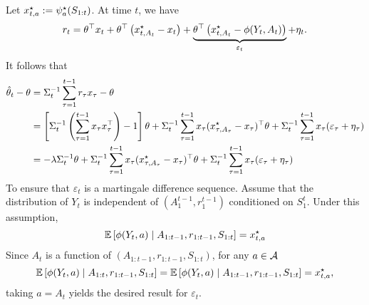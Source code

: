 \documentclass[letterpaper,11pt]{article}
\begin{document}
Let $x^\star_{t,a} := \psi^\star_a(S_{1:t})$.
At time $t$, we have  
$$
r_t = \theta^\top x_t + \theta^\top \left(x^\star_{t,A_t} - x_t\right) + \underbrace{\theta^\top \left(x^\star_{t,A_t} - \phi(Y_t, A_t)\right)}_{\varepsilon_t} + \eta_t.
$$
It follows that 
\begin{equation*}
\begin{aligned}
    \hat{\theta}_t - \theta &= \Sigma_t^{-1} \sum_{\tau=1}^{t-1} r_{\tau} x_{\tau} - \theta \\
    &= \left[\Sigma_t^{-1} \left(\sum_{\tau=1}^{t-1} x_{\tau} x_{\tau}^\top\right) - 1\right] \theta + \Sigma_t^{-1} \sum_{\tau=1}^{t-1} x_{\tau} (x^\star_{\tau,A_\tau} - x_\tau)^\top \theta + \Sigma_t^{-1} \sum_{\tau=1}^{t-1} x_{\tau} (\varepsilon_\tau + \eta_\tau)\\
    &= -\lambda \Sigma_t^{-1} \theta + \Sigma_t^{-1} \sum_{\tau=1}^{t-1} x_{\tau} (x^\star_{\tau,A_\tau} - x_\tau)^\top \theta + \Sigma_t^{-1} \sum_{\tau=1}^{t-1} x_{\tau} (\varepsilon_\tau + \eta_\tau)\\
\end{aligned}
\end{equation*}
To ensure that $\varepsilon_t$ is a martingale difference sequence. 
Assume that the distribution of $Y_t$ is independent of $(A_1^{t-1}, r_{1}^{t-1})$ conditioned on $S_1^{t}$. 
Under this assumption,
\begin{equation*}
    \mathbb{E} \left[\phi(Y_t, a) \mid A_{1:t-1}, r_{1:t-1}, S_{1:t}\right] = x^\star_{t,a}
\end{equation*}
Since $A_t$ is a function of $(A_{1:t-1}, r_{1:t-1}, S_{1:t})$, for any $a \in \mathcal{A}$
\begin{equation*}
    \mathbb{E} \left[\phi(Y_t, a) \mid A_{1:t}, r_{1:t-1}, S_{1:t}\right] = \mathbb{E} \left[\phi(Y_t, a) \mid A_{1:t-1}, r_{1:t-1}, S_{1:t}\right] = x^\star_{t,a},
\end{equation*}
taking $a = A_t$ yields the desired result for $\varepsilon_t$.
\end{document}
